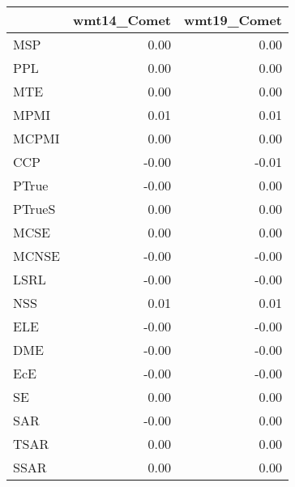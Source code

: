\begin{tabular}{lrr}
\toprule
 & wmt14\_Comet & wmt19\_Comet \\
\midrule
MSP & 0.00 & 0.00 \\
PPL & 0.00 & 0.00 \\
MTE & 0.00 & 0.00 \\
MPMI & 0.01 & 0.01 \\
MCPMI & 0.00 & 0.00 \\
CCP & -0.00 & -0.01 \\
PTrue & -0.00 & 0.00 \\
PTrueS & 0.00 & 0.00 \\
MCSE & 0.00 & 0.00 \\
MCNSE & -0.00 & -0.00 \\
LSRL & -0.00 & -0.00 \\
NSS & 0.01 & 0.01 \\
ELE & -0.00 & -0.00 \\
DME & -0.00 & -0.00 \\
EcE & -0.00 & -0.00 \\
SE & 0.00 & 0.00 \\
SAR & -0.00 & 0.00 \\
TSAR & 0.00 & 0.00 \\
SSAR & 0.00 & 0.00 \\
\bottomrule
\end{tabular}
